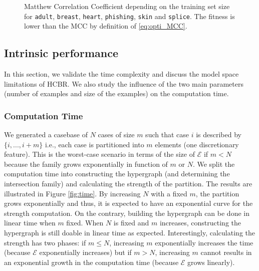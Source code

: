 \documentclass[preprint,12pt]{elsarticle}
\def\HCBR{{\sc HCBR}}
\theoremstyle{definition}
\begin{document}
\begin{figure}[!h]
\caption{Matthew Correlation Coefficient depending on the training set size for \texttt{adult}, \texttt{breast},  \texttt{heart},  \texttt{phishing},  \texttt{skin} and  \texttt{splice}. The fitness is lower than the MCC by definition of \eqref{eq:opti_MCC}.}
\label{fig:mcc_by_examples}
\end{figure}



\subsection{Intrinsic performance}
\label{sec:intrinsic_perf}

In this section, we validate the time complexity and discuss the model space limitations of \HCBR. We also study the influence of the two main parameters (number of examples and size of the examples) on the computation time.\\

\subsubsection{Computation Time} We generated a casebase of $N$ cases of size $m$ such that case $i$ is described by $\{i, ...,  i+m\}$ i.e., each case is partitioned into $m$ elements (one discretionary feature). This is the worst-case scenario in terms of the size of $\mathcal{E}$ if $m < N$ because the family grows exponentially in function of $m$ or $N$. We split the computation time into constructing the hypergraph (and determining the intersection family) and calculating the strength of the partition. The results are illustrated in Figure \ref{fig:time}. By increasing $N$ with a fixed $m$, the partition grows exponentially and thus, it is expected to have an exponential curve for the strength computation. On the contrary, building the hypergraph can be done in linear time when $m$ fixed. When $N$ is fixed and $m$ increases, constructing the hypergraph is still doable in linear time as expected. Interestingly, calculating the strength has two phases: if $m \leq N$, increasing $m$ exponentially increases the time (because $\mathcal{E}$ exponentially increases) but if $m > N$, increasing $m$ cannot results in an exponential growth in the computation time (because $\mathcal{E}$ grows linearly).
\end{document}
